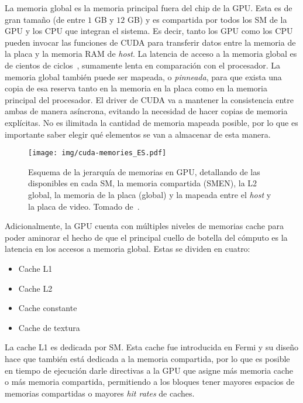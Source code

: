 La memoria global es la memoria principal fuera del chip de la GPU.
Esta es de gran tama\~no (de entre $1$ GB y $12$ GB) y es compartida por todos los SM de la GPU y los CPU que integran el sistema.
Es decir, tanto los GPU como los CPU pueden invocar las funciones de CUDA para transferir datos entre la memoria de la placa y la memoria RAM de \textit{host}.
La latencia de acceso a la memoria global es de cientos de ciclos~\cite{Demystifying}, sumamente lenta en comparaci\'on con el procesador.
La memoria global tambi\'en puede ser mapeada, o \textit{pinneada}, para que exista una copia de esa reserva tanto en la memoria en la placa como en la memoria principal del procesador. El driver de CUDA va a mantener la consistencia entre ambas de manera as\'incrona, evitando la necesidad de hacer copias de memoria expl\'icitas.
No es ilimitada la cantidad de memoria mapeada posible, por lo que es importante saber elegir qu\'e elementos se van a almacenar de esta manera.

\begin{figure}[htbp]
    \centering
    \texttt{[image: img/cuda-memories\_ES.pdf]}
    \caption{Esquema de la jerarqu\'ia de memorias en GPU, detallando de las disponibles en cada SM, la memoria compartida (SMEN), la L2 global, la
    memoria de la placa (global) y la mapeada entre el \textit{host} y la placa de video. Tomado de~\cite{farberCuda}.}
    \label{fig:cuda-memories}
\end{figure}

Adicionalmente, la GPU cuenta con m\'ultiples niveles de memorias cache para poder aminorar el hecho de que el principal cuello de botella del c\'omputo es la latencia en los accesos a memoria global.
Estas se dividen en cuatro:

\begin{itemize}
  \item Cache L1
  \item Cache L2
  \item Cache constante
  \item Cache de textura
\end{itemize}

La cache L1 es dedicada por SM.
Esta cache fue introducida en Fermi y su dise\~no hace que tambi\'en est\'a dedicada a la memoria compartida, por lo que es posible en tiempo de ejecuci\'on darle directivas a la GPU que asigne m\'as memoria cache o m\'as memoria compartida, permitiendo a los bloques tener mayores espacios de memorias compartidas o mayores \textit{hit rates} de caches.

